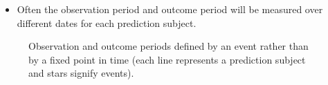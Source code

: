 \documentclass[xcolor={table}]{beamer}
\begin{document}
\begin{frame}
\begin{itemize}
\item Often the observation period and outcome period will be measured over different dates  for each prediction subject. 
\end{itemize}
\begin{figure}[htb]
	\begin{center}
	\end{center}
	\caption{Observation and outcome periods defined by an event rather than by a fixed point in time  (each line represents a prediction subject and stars signify events).}
	\label{fig:pointInTimeEventThenOutcome}
\end{figure}
\end{frame} 

%
\end{document}
